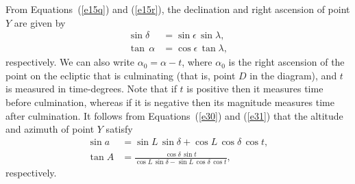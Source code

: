 From Equations~(\ref{e15q}) and (\ref{e15r}), the 
declination and right ascension of point $Y$ are given by
\begin{align}
\sin \delta &= \sin\epsilon\,\sin\lambda,\\[0.5ex]
\tan\,\alpha&=  \cos\epsilon\,\tan\lambda,
\end{align}
respectively.
We can also write $\alpha_0=\alpha-t$, where $\alpha_0$ is the
right ascension of the point on the ecliptic that is culminating (that is, point
$D$ in the diagram), and $t$ is measured in time-degrees. Note that if 	$t$ is positive then it measures time before culmination,
whereas if it is negative then its magnitude measures time after culmination. 
It follows from Equations~(\ref{e30}) and (\ref{e31})  that the altitude  and azimuth of point $Y$ satisfy
\begin{align}\label{e46}
\sin a &= \sin L\,\sin\delta + \cos L\,\cos\delta\,\cos t,\\[0.5ex]
\tan A &=\frac{\cos \delta\,\sin t}{\cos L\,\sin \delta - \sin L\,\cos\delta\,\cos t},
\end{align}
respectively.

